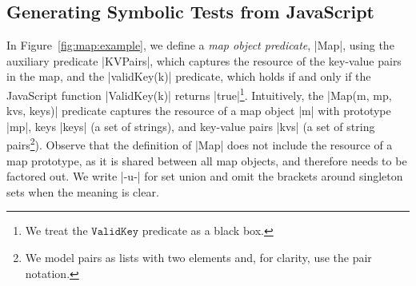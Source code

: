 

\subsection{Generating Symbolic Tests from JavaScript} 
\label{specs:example}

In Figure~\ref{fig:map:example}, we define a \emph{map object predicate}, \jsinline|Map|, 
using the auxiliary predicate \jsinline|KVPairs|, which captures the resource of the key-value pairs in the map, 
and the \jsinline|validKey(k)| predicate, which holds if and only if the 
JavaScript function \jsinline|ValidKey(k)| returns \jsinline|true|\footnote{We treat the $\mathtt{ValidKey}$ predicate as a black box.}.
%
Intuitively, the \jsinline|Map(m, mp, kvs, keys)| predicate captures the resource 
of a map object \jsinline|m| with prototype \jsinline|mp|, keys \jsinline|keys| (a set of strings),
and key-value pairs \jsinline|kvs| (a set of string pairs\footnote{We model pairs as lists with two elements and, for clarity, use the pair notation.}). 
Observe that the definition of \jsinline|Map| does not include the resource of a map prototype, as
it is shared between all map objects, and therefore needs to be factored out.  
%
We write \jsinline|-u-| for set union and omit the brackets around singleton 
sets when the meaning is clear. %

